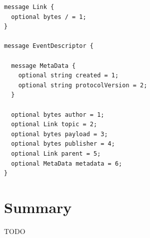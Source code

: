 \noindent\begin{minipage}{\textwidth}
\vspace{8pt}
\begin{lstlisting}[language=protobuf3,caption={Protobuf schema of the event descriptor},label={proto-event-descriptor}]
message Link {
  optional bytes / = 1;
}

message EventDescriptor {

  message MetaData {
    optional string created = 1;
    optional string protocolVersion = 2;
  }

  optional bytes author = 1;
  optional Link topic = 2;
  optional bytes payload = 3;
  optional bytes publisher = 4;
  optional Link parent = 5;
  optional MetaData metadata = 6;
}
\end{lstlisting}
\vspace{8pt}
\end{minipage}

\section{Summary}\label{summary}

TODO

